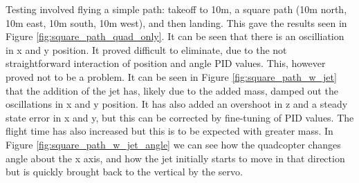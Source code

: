 \documentclass[10pt]{article}
\begin{document}
Testing involved flying a simple path: takeoff to 10m, a square path (10m north, 10m east, 10m south, 10m west), and then landing. This gave the results seen in Figure \ref{fig:square_path_quad_only}. It can be seen that there is an oscilliation in x and y position. It proved difficult to eliminate, due to the not straightforward interaction of position and angle PID values. This, however proved not to be a problem. It can be seen in Figure \ref{fig:square_path_w_jet} that the addition of the jet has, likely due to the added mass, damped out the oscillations in x and y position. It has also added an overshoot in z and a steady state error in x and y, but this can be corrected by fine-tuning of PID values. The flight time has also increased but this is to be expected with greater mass. In Figure \ref{fig:square_path_w_jet_angle} we can see how the quadcopter changes angle about the x axis, and how the jet initially starts to move in that direction but is quickly brought back to the vertical by the servo.
\end{document}
